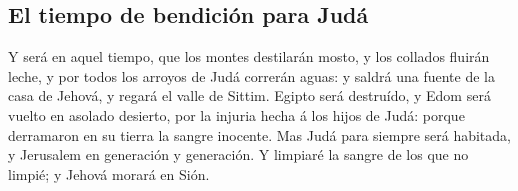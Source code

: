 \hypertarget{el-tiempo-de-bendiciuxf3n-para-juduxe1}{%
\subsection{El tiempo de bendición para
Judá}\label{el-tiempo-de-bendiciuxf3n-para-juduxe1}}

 Y será en aquel tiempo, que los montes destilarán mosto, y
los collados fluirán leche, y por todos los arroyos de Judá correrán
aguas: y saldrá una fuente de la casa de Jehová, y regará el valle de
Sittim.  Egipto será destruído, y Edom será vuelto en
asolado desierto, por la injuria hecha á los hijos de Judá: porque
derramaron en su tierra la sangre inocente.  Mas Judá para
siempre será habitada, y Jerusalem en generación y generación.
 Y limpiaré la sangre de los que no limpié; y Jehová morará
en Sión.
